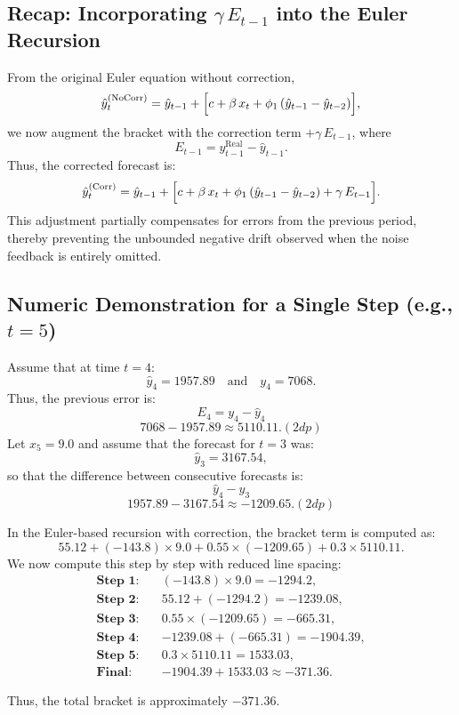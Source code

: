 \documentclass{article}
\begin{document}
\subsection{Recap: Incorporating \(\gamma\,E_{t-1}\) into the Euler Recursion}
From the original Euler equation without correction,
\[
\hat{y}_t^{(\mathrm{NoCorr})} = \hat{y}_{t-1} + \Bigl[c + \beta\,x_t + \phi_1\,(\hat{y}_{t-1}-\hat{y}_{t-2})\Bigr],
\]
we now augment the bracket with the correction term \(+\gamma\,E_{t-1}\), where
\[
E_{t-1} = y_{t-1}^{\mathrm{Real}} - \hat{y}_{t-1}.
\]
Thus, the corrected forecast is:
\[
\hat{y}_t^{(\mathrm{Corr})} = \hat{y}_{t-1} + \Bigl[c + \beta\,x_t + \phi_1\,(\hat{y}_{t-1}-\hat{y}_{t-2}) + \gamma\,E_{t-1}\Bigr].
\]
This adjustment partially compensates for errors from the previous period, thereby preventing the unbounded negative drift observed when the noise feedback is entirely omitted.

\subsection{Numeric Demonstration for a Single Step (e.g., \(t=5\))}
Assume that at time \(t=4\):
\[
\hat{y}_4 = 1957.89 \quad \text{and} \quad y_4 = 7068.
\]
Thus, the previous error is:
\[
E_4 = y_4 - \hat{y}_4 \] \[ 7068 - 1957.89 \approx 5110.11. (2dp)
\]
Let \(x_5 = 9.0\) and assume that the forecast for \(t=3\) was:
\[
\hat{y}_3 = 3167.54,
\]
so that the difference between consecutive forecasts is:
\[
\hat{y}_4 - \hat{y}_3 \] \[ 1957.89 - 3167.54 \approx -1209.65. (2dp)
\]

In the Euler-based recursion with correction, the bracket term is computed as:
\[
55.12 + (-143.8)\times 9.0 + 0.55\times (-1209.65) + 0.3\times 5110.11.
\]
We now compute this step by step with reduced line spacing:
\begingroup
\setlength{\jot}{1mm}
\begin{align*}
\textbf{Step 1:} \quad & (-143.8) \times 9.0 = -1294.2,\\
\textbf{Step 2:} \quad & 55.12 + (-1294.2) = -1239.08,\\
\textbf{Step 3:} \quad & 0.55 \times (-1209.65) = -665.31,\\
\textbf{Step 4:} \quad & -1239.08 + (-665.31) = -1904.39,\\
\textbf{Step 5:} \quad & 0.3 \times 5110.11 = 1533.03,\\
\textbf{Final:} \quad & -1904.39 + 1533.03 \approx -371.36.
\end{align*}
\endgroup

Thus, the total bracket is approximately \(-371.36\).
\end{document}
